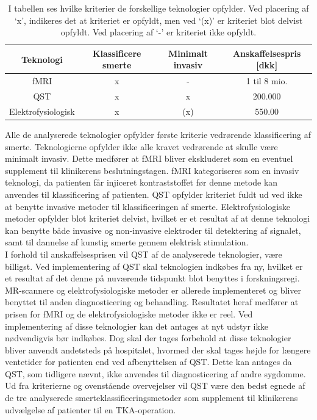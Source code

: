 \begin{table}[H]
	\centering
	\begin{tabular}{cccc}
		\hline
		\rowcolor[HTML]{C0C0C0} 
		Teknologi          & Klassificere smerte & Minimalt invasiv & Anskaffelsespris  {[}dkk{]} \\ \hline
		fMRI               & x                   & -                & 1 til 8 mio.          \\
		QST                & x                   & x                & 200.000               \\
		Elektrofysiologisk & x                   & (x)              & 550.00                \\ \hline
	\end{tabular}
	\caption{I tabellen ses hvilke kriterier de forskellige teknologier opfylder. Ved placering af ‘x’, indikeres det at kriteriet er opfyldt, men ved ‘(x)’ er kriteriet blot delvist opfyldt. Ved placering af ‘-’ er kriteriet ikke opfyldt.}
	\label{tab:succeskriterier_metoder}
\end{table} \vspace{-.5cm}
Alle de analyserede teknologier opfylder første kriterie vedrørende klassificering af smerte. Teknologierne opfylder ikke alle kravet vedrørende at skulle være minimalt invasiv. Dette medfører at fMRI bliver ekskluderet som en eventuel supplement til klinikerens beslutningstagen. fMRI kategoriseres som en invasiv teknologi, da patienten får injiceret kontraststoffet før denne metode kan anvendes til klassificering af patienten. QST opfylder kriteriet fuldt ud ved ikke at benytte invasive metoder til klassificeringen af smerte. Elektrofysiologiske metoder opfylder blot kriteriet delvist, hvilket er et resultat af at denne teknologi kan benytte både invasive og non-invasive elektroder til detektering af signalet, samt til dannelse af kunstig smerte gennem elektrisk stimulation. \\
I forhold til anskaffelsesprisen vil QST af de analyserede teknologier, være billigst. Ved implementering af QST skal teknologien indkøbes fra ny, hvilket er et resultat af det denne på nuværende tidspunkt blot benyttes i forskningsregi. MR-scannere og elektrofysiologiske metoder er allerede implementeret og bliver benyttet til anden diagnosticering og behandling. Resultatet heraf medfører at prisen for fMRI og de elektrofysiologiske metoder ikke er reel. Ved implementering af disse teknologier kan det antages at nyt udstyr ikke nødvendigvis bør indkøbes. Dog skal der tages forbehold at disse teknologier bliver anvendt andetsteds på hospitalet, hvormed der skal tages højde for længere ventetider for patienten end ved afbenyttelsen af QST. Dette kan antages da QST, som tidligere nævnt, ikke anvendes til diagnosticering af andre sygdomme. \\
Ud fra kriterierne og ovenstående overvejelser vil QST være den bedst egnede af de tre analyserede smerteklassificeringsmetoder som supplement til klinikerens udvælgelse af patienter til en TKA-operation.  



